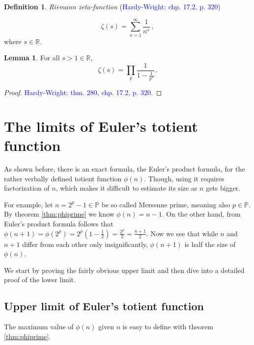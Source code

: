 \documentclass{article}
\theoremstyle{definition}
\newtheorem{definition}[subsection]{Definition}
\newtheorem{lemma}[subsection]{Lemma}
\begin{document}
\begin{definition}{\emph{Riemann zeta-function} (\textcolor{blue}{Hardy-Wright: chp. 17.2, p. 320})}

\begin{equation*}
    \zeta(s)=\sum_{n=1}^\infty \frac{1}{n^s}\,,
\end{equation*}
where $s\in\mathbb{R}$.
\end{definition}

\begin{lemma}
\label{lemma:zeta}
For all $s>1\in\mathbb{R}$, 
\begin{equation*}
    \zeta(s)=\prod_p \frac{1}{1-\frac{1}{p^s}}\,.
\end{equation*}
\begin{proof}
\textcolor{blue}{Hardy-Wright: thm. 280, chp. 17.2, p. 320}.
\end{proof}
\end{lemma}

\section{The limits of Euler's totient function}

As shown before, there is an exact formula, the Euler's product formula, for the rather verbally defined totient function $\phi(n)$. Though, using it requires factorization of $n$, which makes it difficult to estimate its size as $n$ gets bigger.

For example, let $n = 2^p - 1 \in \mathbb{P}$ be so called Mersenne prime, meaning also $p \in \mathbb{P}$. By theorem \ref{thm:phiprime} we know $\phi(n) = n - 1$. On the other hand, from Euler's product formula follows that $\phi(n+1) = \phi(2^p) = 2^p(1-\frac{1}{2}) = \frac{2^p}{2} = \frac{n+1}{2}$. Now we see that while $n$ and $n+1$ differ from each other only insignificantly, $\phi(n+1)$ is half the size of $\phi(n)$.

We start by proving the fairly obvious upper limit and then dive into a detailed proof of the lower limit.

\subsection{Upper limit of Euler's totient function}

The maximum value of $\phi(n)$ given $n$ is easy to define with theorem \ref{thm:phiprime}.
\end{document}
